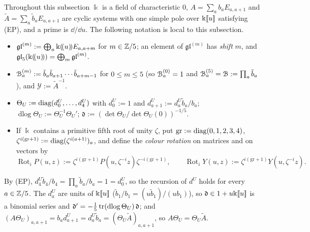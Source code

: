 Throughout this subsection $\Bbbk$ is a field of characteristic $0$, $A=\sum_ab_aE_{a,a+1}$ and $\tilde A=\sum_a\tilde b_aE_{a,a+1}$ are cyclic systems with one simple pole over $\Bbbk[\![ u ]\!]$ satisfying (EP), and a prime is $\dd/\dd u$. The following notation is local to this subsection.
\begin{itemize}
\item $\mathfrak{gl}^{(m)}:=\bigoplus_a\Bbbk(\!(u)\!)E_{a,a+m}$ for $m\in\mathbb{Z}/5$; an element of $\mathfrak{gl}^{(m)}$ has \emph{shift} $m$, and $\mathfrak{gl}_5(\Bbbk(\!(u)\!))=\bigoplus_m\mathfrak{gl}^{(m)}$.
\item $\mathcal{B}^{(m)}_a:=\tilde b_a\tilde b_{a+1}\cdots\tilde b_{a+m-1}$ for $0\leq m\leq5$ (so $\mathcal{B}^{(0)}_a=1$ and $\mathcal{B}^{(5)}_a=\mathcal{B}:=\prod_a\tilde b_a$), and $\mathcal Y:=\tilde A^{-1}$.
\item $\Theta_U:=\operatorname{diag}(d^U_0,\dots,d^U_4)$ with $d^U_0:=1$ and $d^U_{a+1}:=d^U_a\tilde b_a/b_a$; $\operatorname{dlog}\Theta_U:=\Theta_U^{-1}\Theta_U'$; $\mathfrak d:=(\det\Theta_U/\det\Theta_U(0))^{-1/5}$.
\item If $\Bbbk$ contains a primitive fifth root of unity $\zeta$, put $\mathrm{gr}:=\operatorname{diag}(0,1,2,3,4)$, $\zeta^{i(\mathrm{gr}+1)}:=\operatorname{diag}(\zeta^{i(a+1)})_a$, and define the \emph{colour rotation} on matrices and on vectors by
\[
\operatorname{Rot}_iP(u,z):=\zeta^{i(\mathrm{gr}+1)}P(u,\zeta^{-i}z)\zeta^{-i(\mathrm{gr}+1)},\qquad \operatorname{Rot}_iY(u,z):=\zeta^{i(\mathrm{gr}+1)}Y(u,\zeta^{-i}z).
\]
\end{itemize}
By (EP), $d^U_4\tilde b_4/b_4=\prod_a\tilde b_a/b_a=1=d^U_0$, so the recursion of $d^U$ holds for every $a\in\mathbb{Z}/5$. The $d^U_a$ are units of $\Bbbk[\![ u ]\!]$ ($\tilde b_1/b_1=(u\tilde b_1)/(ub_1)$), so $\mathfrak d\in1+u\Bbbk[\![ u ]\!]$ is a binomial series and $\mathfrak d'=-\frac15\operatorname{tr}(\operatorname{dlog}\Theta_U)\,\mathfrak d$; and $(A\Theta_U)_{a,a+1}=b_ad^U_{a+1}=d^U_a\tilde b_a=(\Theta_U\tilde A)_{a,a+1}$, so $A\Theta_U=\Theta_U\tilde A$.


